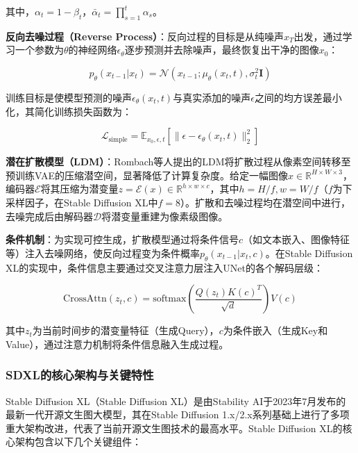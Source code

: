 \documentclass[12pt,a4paper]{ctexart}
\newcommand{\sdxl}{Stable Diffusion XL}
\begin{document}
其中，$\alpha_t = 1 - \beta_t$，$\bar{\alpha}_t = \prod_{s=1}^{t} \alpha_s$。

\textbf{反向去噪过程（Reverse Process）}：反向过程的目标是从纯噪声$x_T$出发，通过学习一个参数为$\theta$的神经网络$\epsilon_\theta$逐步预测并去除噪声，最终恢复出干净的图像$x_0$：

\begin{equation}
p_\theta(x_{t-1} | x_t) = \mathcal{N}(x_{t-1}; \mu_\theta(x_t, t), \sigma_t^2 \mathbf{I})
\label{eq:reverse}
\end{equation}

训练目标是使模型预测的噪声$\epsilon_\theta(x_t, t)$与真实添加的噪声$\epsilon$之间的均方误差最小化，其简化训练损失函数为：

\begin{equation}
\mathcal{L}_{\text{simple}} = \mathbb{E}_{x_0, \epsilon, t}\left[ \|\epsilon - \epsilon_\theta(x_t, t)\|_2^2 \right]
\label{eq:loss}
\end{equation}

\textbf{潜在扩散模型（LDM）}：Rombach等人提出的LDM将扩散过程从像素空间转移至预训练VAE的压缩潜空间，显著降低了计算复杂度。给定一幅图像$x \in \mathbb{R}^{H \times W \times 3}$，编码器$\mathcal{E}$将其压缩为潜变量$z = \mathcal{E}(x) \in \mathbb{R}^{h \times w \times c}$，其中$h = H/f, w = W/f$（$f$为下采样因子，在\sdxl{}中$f=8$）。扩散和去噪过程均在潜空间中进行，去噪完成后由解码器$\mathcal{D}$将潜变量重建为像素级图像。

\textbf{条件机制}：为实现可控生成，扩散模型通过将条件信号$c$（如文本嵌入、图像特征等）注入去噪网络，使反向过程变为条件概率$p_\theta(x_{t-1} | x_t, c)$。在\sdxl{}的实现中，条件信息主要通过交叉注意力层注入UNet的各个解码层级：

\begin{equation}
\text{CrossAttn}(z_t, c) = \text{softmax}\left(\frac{Q(z_t) K(c)^T}{\sqrt{d}}\right) V(c)
\label{eq:cross-attn}
\end{equation}

其中$z_t$为当前时间步的潜变量特征（生成Query），$c$为条件嵌入（生成Key和Value），通过注意力机制将条件信息融入生成过程。

\subsubsection{SDXL的核心架构与关键特性}

\sdxl{}（Stable Diffusion XL）是由Stability AI于2023年7月发布的最新一代开源文生图大模型，其在Stable Diffusion 1.x/2.x系列基础上进行了多项重大架构改进，代表了当前开源文生图技术的最高水平。\sdxl{}的核心架构包含以下几个关键组件：
\end{document}
